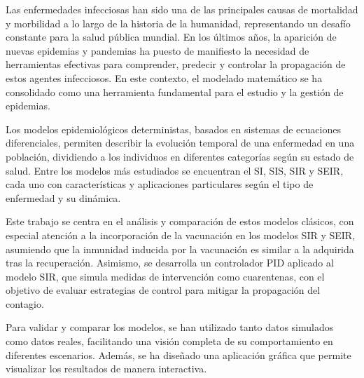 Las enfermedades infecciosas han sido una de las principales causas de mortalidad y morbilidad a lo largo de la historia de la humanidad, representando un desafío constante para la salud pública mundial. En los últimos años, la aparición de nuevas epidemias y pandemias ha puesto de manifiesto la necesidad de herramientas efectivas para comprender, predecir y controlar la propagación de estos agentes infecciosos. En este contexto, el modelado matemático se ha consolidado como una herramienta fundamental para el estudio y la gestión de epidemias.

Los modelos epidemiológicos deterministas, basados en sistemas de ecuaciones diferenciales, permiten describir la evolución temporal de una enfermedad en una población, dividiendo a los individuos en diferentes categorías según su estado de salud. Entre los modelos más estudiados se encuentran el SI, SIS, SIR y SEIR, cada uno con características y aplicaciones particulares según el tipo de enfermedad y su dinámica.

Este trabajo se centra en el análisis y comparación de estos modelos clásicos, con especial atención a la incorporación de la vacunación en los modelos SIR y SEIR, asumiendo que la inmunidad inducida por la vacunación es similar a la adquirida tras la recuperación. Asimismo, se desarrolla un controlador PID aplicado al modelo SIR, que simula medidas de intervención como cuarentenas, con el objetivo de evaluar estrategias de control para mitigar la propagación del contagio.

Para validar y comparar los modelos, se han utilizado tanto datos simulados como datos reales, facilitando una visión completa de su comportamiento en diferentes escenarios. Además, se ha diseñado una aplicación gráfica que permite visualizar los resultados de manera interactiva.

